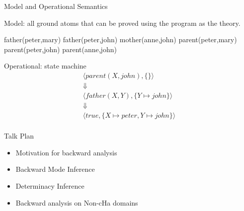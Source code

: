\documentclass{beamer}
\def\pspace{\vspace*{\fill}}
\begin{document}
\begin{frame}[fragile]{Model and Operational Semantics}
\pspace

\begin{minipage}[t]{.45\textwidth}
Model: all ground atoms that can be proved using the program as
the theory. \vspace{1pc}

\begin{semiverbatim}
  father(peter,mary)
  father(peter,john)
  mother(anne,john)
  parent(peter,mary)
  parent(peter,john)
  parent(anne,john)
\end{semiverbatim}
\end{minipage} \hspace{\fill}
\begin{minipage}[t]{.45\textwidth}
Operational: state machine
\[ \begin{array}{c}
\langle parent(X,john),\{\}\rangle \\

\Downarrow  \\

\langle father(X,Y) , \{Y\mapsto john\} \rangle \\

\Downarrow \\

\langle true, \{X\mapsto peter,Y\mapsto john\} \rangle \\
\end{array}
\]
\end{minipage}


\pspace
\end{frame}


\begin{frame}{Talk Plan}
\begin{itemize}
\item Motivation for backward analysis

\item Backward Mode Inference

\item Determinacy Inference

\item Backward analysis on Non-cHa domains

\end{itemize}

\end{frame}
\end{document}
